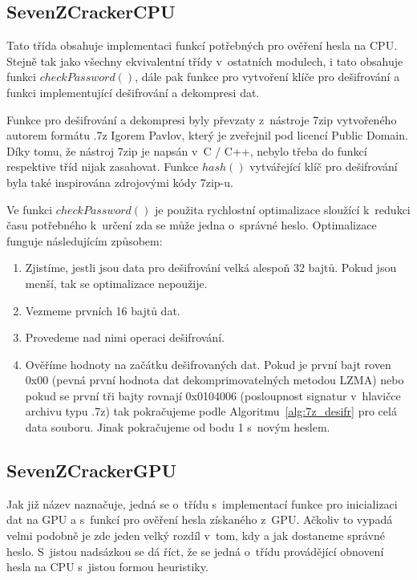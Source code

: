 \subsection{SevenZCrackerCPU}
\label{ssec:7zcrackercpu}
Tato třída obsahuje implementaci funkcí potřebných pro ověření hesla na CPU. Stejně tak jako
všechny ekvivalentní třídy v~ostatních modulech, i tato obsahuje funkci
\linebreak $checkPassword()$, dále pak
funkce pro vytvoření klíče pro dešifrování a funkci implementující dešifrování a dekompresi dat.

 Funkce pro dešifrování a dekompresi byly převzaty z~nástroje 7zip vytvořeného autorem formátu .7z
Igorem Pavlov, který je zveřejnil pod licencí Public Domain. Díky tomu, že nástroj 7zip je
napsán v~C / C++, nebylo třeba do funkcí respektive tříd nijak zasahovat. Funkce $hash()$
vytvářející klíč pro dešifrování byla také inspirována zdrojovými kódy 7zip-u. 

 Ve funkci $checkPassword()$ je použita rychlostní optimalizace sloužící k~redukci času
potřebného k~určení zda se může jedna o~správné heslo. Optimalizace funguje následujícím způsobem:
\begin{enumerate}
    \item Zjistíme, jestli jsou data pro dešifrování velká alespoň 32 bajtů. Pokud jsou menší, tak
	se optimalizace nepoužije.
    \item Vezmeme prvních 16 bajtů dat.
    \item Provedeme nad nimi operaci dešifrování.
    \item Ověříme hodnoty na začátku dešifrovaných dat. Pokud je první bajt roven 0x00
	(pevná první hodnota dat dekomprimovatelných metodou LZMA) nebo pokud se první tři bajty rovnají
	0x0104006 (posloupnost signatur v~hlavičce archivu typu .7z) tak pokračujeme podle
	Algoritmu~\ref{alg:7z_desifr} pro celá data souboru. Jinak pokračujeme od bodu 1 s~novým heslem.
\end{enumerate}
\subsection{SevenZCrackerGPU}
Jak již název naznačuje, jedná se o~třídu s~implementací funkce pro inicializaci dat na GPU a
s~funkcí pro ověření hesla získaného z~GPU. Ačkoliv to vypadá velmi podobně je zde jeden velký
rozdíl v~tom, kdy a jak dostaneme správné heslo. S~jistou nadsázkou se dá říct, že se jedná
o~třídu provádějící obnovení hesla na CPU s~jistou formou heuristiky. 

